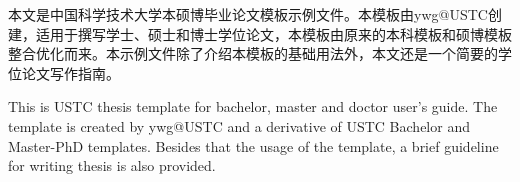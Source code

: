 ﻿\begin{cnabstract}
本文是中国科学技术大学本硕博毕业论文模板示例文件。本模板由ywg@USTC创建，适用于撰写学士、硕士和博士学位论文，本模板由原来的本科模板和硕博模板整合优化而来。本示例文件除了介绍本模板的基础用法外，本文还是一个简要的学位论文写作指南。

\end{cnabstract}

\begin{enabstract}
This is USTC thesis template for bachelor, master and doctor user's guide. The template is created by ywg@USTC and a derivative of USTC Bachelor and Master-PhD templates. Besides that
the usage of the template, a brief
guideline for writing thesis is also provided.

\end{enabstract}
